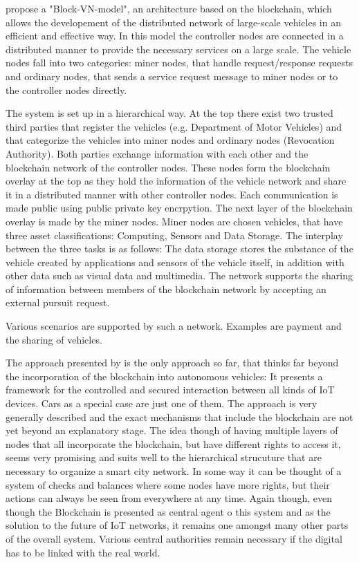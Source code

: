 \citeauthor{Sharma2017} propose a "Block-VN-model", an architecture based on the blockchain, which allows the developement of the distributed network of large-scale vehicles in an efficient and effective way. In this model the controller nodes are connected in a distributed manner to provide the necessary services on a large scale. The vehicle nodes fall into two categories: miner nodes, that handle request/response requests and ordinary nodes, that sends a service request message to miner nodes or to the controller nodes directly.

The system is set up in a hierarchical way. At the top there exist two trusted third parties that register the vehicles (e.g. Department of Motor Vehicles) and that categorize the vehicles into miner nodes and ordinary nodes (Revocation Authority). Both parties exchange information with each other and the blockchain network of the controller nodes. These nodes form the blockchain overlay at the top as they hold the information of the vehicle network and share it in a distributed manner with other controller nodes. Each communication is made public using  public private key encrpytion.
The next layer of the blockchain overlay is made by the miner nodes. Miner nodes are chosen vehicles, that have three asset classifications: Computing, Sensors and Data Storage. The interplay between the three tasks is as follows: The data storage stores the substance of the vehicle created by applications and sensors of the vehicle itself, in addition with other data such as visual data and multimedia. The network supports the sharing of information between members of the blockchain network by accepting an external pursuit request.

Various scenarios are supported by such a network. Examples are payment and the sharing of vehicles.

The approach presented by \citeauthor{Sharma2017} is the only approach so far, that thinks far beyond the incorporation of the blockchain into autonomous vehicles: It presents a framework for the controlled and secured interaction between all kinds of IoT devices. Cars as a special case are just one of them. The approach is very generally described and the exact mechanisms that include the blockchain are not yet beyond an explanatory stage.
The idea though of having multiple layers of nodes that all incorporate the blockchain, but have different rights to access it, seems very promising and suits well to the hierarchical strucuture that are necessary to organize a smart city network. In some way it can be thought of a system of checks and balances where some nodes have more rights, but their actions can always be seen from everywhere at any time.
Again though, even though the Blockchain is presented as central agent o this system and as the solution to the future of IoT networks, it remains one amongst many other parts of the overall system. Various central authorities remain necessary if the digital has to be linked with the real world.

